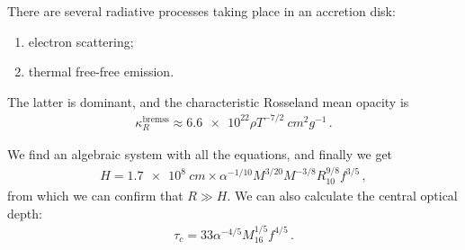 \documentclass[main.tex]{subfiles}
\begin{document}
There are several radiative processes taking place in an accretion disk: 
\begin{enumerate}
    \item electron scattering;
    \item thermal free-free emission.
\end{enumerate}

The latter is dominant, and the characteristic Rosseland mean opacity is 
%
\begin{align}
\kappa _R^{\text{bremss}} \approx \num{6.6e22} \rho T^{-7/2} \SI{}{cm^2 g^{-1}}
\,.
\end{align}

We find an algebraic system with all the equations, and finally we get 
%
\begin{align}
H = \SI{1.7e8}{cm} \times \alpha^{-1/10} M^{3/20} M^{-3/8} R_{10}^{9/8} f^{3/5}
\,,
\end{align}
%
from which we can confirm that \(R \gg H\). 
We can also calculate the central optical depth: 
%
\begin{align}
\tau _c = 33 \alpha^{-4/5} M_{16}^{1/5} f^{4/5}
\,.
\end{align}
\end{document}
